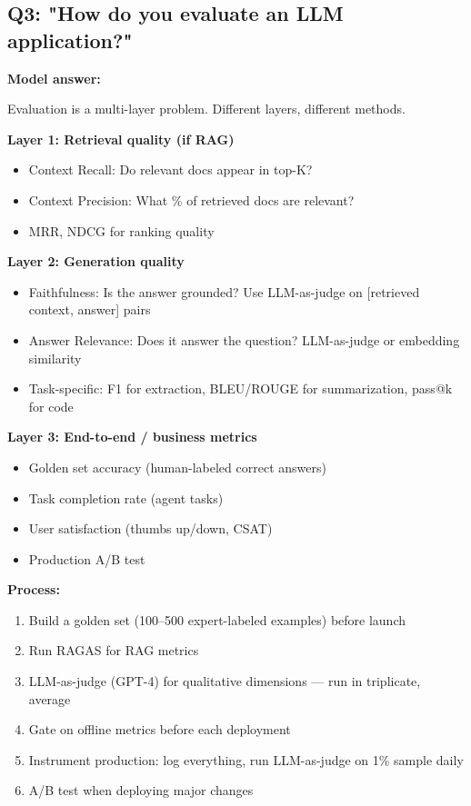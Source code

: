 \documentclass[11pt]{article}
\providecommand{\tightlist}{\setlength{\itemsep}{1pt}\setlength{\parskip}{0pt}}
\begin{document}
\subsection{Q3: "How do you evaluate an LLM application?"}\label{q3-how-do-you-evaluate-an-llm-application}

\textbf{Model answer:}

Evaluation is a multi-layer problem. Different layers, different methods.

\textbf{Layer 1: Retrieval quality (if RAG)}

\begin{itemize}
\tightlist
\item
  Context Recall: Do relevant docs appear in top-K?
\item
  Context Precision: What \% of retrieved docs are relevant?
\item
  MRR, NDCG for ranking quality
\end{itemize}

\textbf{Layer 2: Generation quality}

\begin{itemize}
\tightlist
\item
  Faithfulness: Is the answer grounded? Use LLM-as-judge on {[}retrieved context, answer{]} pairs
\item
  Answer Relevance: Does it answer the question? LLM-as-judge or embedding similarity
\item
  Task-specific: F1 for extraction, BLEU/ROUGE for summarization, pass@k for code
\end{itemize}

\textbf{Layer 3: End-to-end / business metrics}

\begin{itemize}
\tightlist
\item
  Golden set accuracy (human-labeled correct answers)
\item
  Task completion rate (agent tasks)
\item
  User satisfaction (thumbs up/down, CSAT)
\item
  Production A/B test
\end{itemize}

\textbf{Process:}

\begin{enumerate}
\def\labelenumi{\arabic{enumi}.}
\tightlist
\item
  Build a golden set (100--500 expert-labeled examples) before launch
\item
  Run RAGAS for RAG metrics
\item
  LLM-as-judge (GPT-4) for qualitative dimensions --- run in triplicate, average
\item
  Gate on offline metrics before each deployment
\item
  Instrument production: log everything, run LLM-as-judge on 1\% sample daily
\item
  A/B test when deploying major changes
\end{enumerate}
\end{document}
